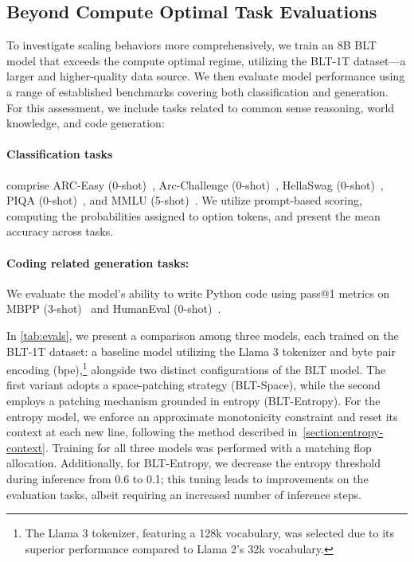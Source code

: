 \subsection{Beyond Compute Optimal Task Evaluations}
\label{section:evals}
To investigate scaling behaviors more comprehensively, we train an 8B {\textsc BLT} model that exceeds the compute optimal regime, utilizing the {\textsc BLT}-1T dataset—a larger and higher-quality data source. We then evaluate model performance using a range of established benchmarks covering both classification and generation. For this assessment, we include tasks related to common sense reasoning, world knowledge, and code generation:
\paragraph{Classification tasks} comprise ARC-Easy (0-shot)~\citep{Eval_ARC}, Arc-Challenge (0-shot)~\citep{Eval_ARC}, HellaSwag (0-shot)~\citep{Eval_hellaswag}, PIQA (0-shot)~\citep{Eval_piqa}, and MMLU (5-shot)~\citep{hendrycks2020measuring}.  We utilize prompt-based scoring, computing the probabilities assigned to option tokens, and present the mean accuracy across tasks.
\paragraph{Coding related generation tasks:} We evaluate the model’s ability to write Python code using pass@1 metrics on MBPP (3-shot)~\citep{Eval_MBPP} and HumanEval (0-shot)~\citep{Eval_HumanEval}.

In \autoref{tab:evals}, we present a comparison among three models, each trained on the {\textsc BLT}-1T dataset: a baseline model utilizing the Llama 3 tokenizer and byte pair encoding (bpe),\footnote{The Llama 3 tokenizer, featuring a 128k vocabulary, was selected due to its superior performance compared to Llama 2's 32k vocabulary.} alongside two distinct configurations of the {\textsc BLT} model. The first variant adopts a space-patching strategy ({\textsc BLT}-Space), while the second employs a patching mechanism grounded in entropy ({\textsc BLT}-Entropy). For the entropy model, we enforce an approximate monotonicity constraint and reset its context at each new line, following the method described in~\autoref{section:entropy-context}. Training for all three models was performed with a matching flop allocation. Additionally, for {\textsc BLT}-Entropy, we decrease the entropy threshold during inference from 0.6 to 0.1; this tuning leads to improvements on the evaluation tasks, albeit requiring an increased number of inference steps.

